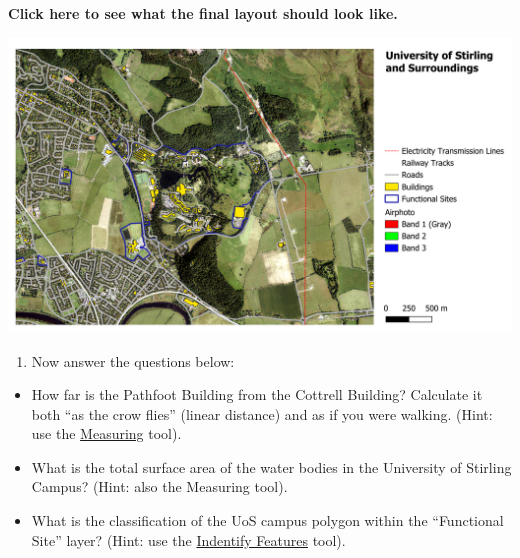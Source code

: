 \documentclass[
  letterpaper,
  DIV=11,
  numbers=noendperiod]{scrreprt}
\providecommand{\tightlist}{%
  \setlength{\itemsep}{0pt}\setlength{\parskip}{0pt}}\usepackage{longtable,booktabs,array}
\begin{document}
\begin{tcolorbox}[enhanced jigsaw, toprule=.15mm, breakable, left=2mm, colframe=quarto-callout-important-color-frame, colback=white, arc=.35mm, leftrule=.75mm, opacityback=0, rightrule=.15mm, bottomrule=.15mm]

\vspace{-3mm}\textbf{Click here to see what the final layout should look like.}\vspace{3mm}

\includegraphics{images/lab_1/lab1_fig7_indmap.png}

\end{tcolorbox}

\begin{enumerate}
\def\labelenumi{\arabic{enumi}.}
\setcounter{enumi}{9}
\tightlist
\item
  Now answer the questions below:
\end{enumerate}

\begin{itemize}
\item
  How far is the Pathfoot Building from the Cottrell Building? Calculate
  it both ``as the crow flies'' (linear distance) and as if you were
  walking. (Hint: use the
  \href{https://docs.qgis.org/3.34/en/docs/user_manual/map_views/map_view.html\#sec-measure}{Measuring}
  tool).
\item
  What is the total surface area of the water bodies in the University
  of Stirling Campus? (Hint: also the Measuring tool).
\item
  What is the classification of the UoS campus polygon within the
  ``Functional Site'' layer? (Hint: use the
  \href{https://docs.qgis.org/3.34/en/docs/user_manual/introduction/general_tools.html\#identify}{Indentify
  Features} tool).
\end{itemize}
\end{document}
